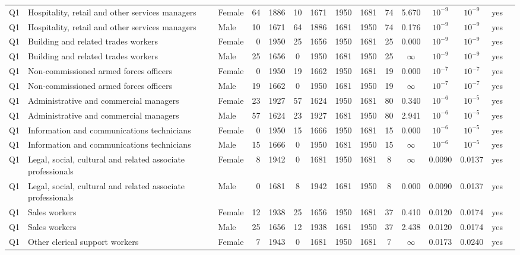 \begin{longtable}{lllrcccccccccll}
Q1 & Hospitality, retail and other services managers & Female & 64 & 1886 & 10 & 1671 & 1950 & 1681 & 74 & 5.670 & $10^{-9}$ & $10^{-9}$ & yes \\
Q1 & Hospitality, retail and other services managers & Male & 10 & 1671 & 64 & 1886 & 1681 & 1950 & 74 & 0.176 & $10^{-9}$ & $10^{-9}$ & yes \\
Q1 & Building and related trades workers & Female & 0 & 1950 & 25 & 1656 & 1950 & 1681 & 25 & 0.000 & $10^{-9}$ & $10^{-9}$ & yes \\
Q1 & Building and related trades workers & Male & 25 & 1656 & 0 & 1950 & 1681 & 1950 & 25 & $\infty$ & $10^{-9}$ & $10^{-9}$ & yes \\
Q1 & Non-commissioned armed forces officers & Female & 0 & 1950 & 19 & 1662 & 1950 & 1681 & 19 & 0.000 & $10^{-7}$ & $10^{-7}$ & yes \\
Q1 & Non-commissioned armed forces officers & Male & 19 & 1662 & 0 & 1950 & 1681 & 1950 & 19 & $\infty$ & $10^{-7}$ & $10^{-7}$ & yes \\
Q1 & Administrative and commercial managers & Female & 23 & 1927 & 57 & 1624 & 1950 & 1681 & 80 & 0.340 & $10^{-6}$ & $10^{-5}$ & yes \\
Q1 & Administrative and commercial managers & Male & 57 & 1624 & 23 & 1927 & 1681 & 1950 & 80 & 2.941 & $10^{-6}$ & $10^{-5}$ & yes \\
Q1 & Information and communications technicians & Female & 0 & 1950 & 15 & 1666 & 1950 & 1681 & 15 & 0.000 & $10^{-6}$ & $10^{-5}$ & yes \\
Q1 & Information and communications technicians & Male & 15 & 1666 & 0 & 1950 & 1681 & 1950 & 15 & $\infty$ & $10^{-6}$ & $10^{-5}$ & yes \\
Q1 & Legal, social, cultural and related associate professionals & Female & 8 & 1942 & 0 & 1681 & 1950 & 1681 & 8 & $\infty$ & 0.0090 & 0.0137 & yes \\
Q1 & Legal, social, cultural and related associate professionals & Male & 0 & 1681 & 8 & 1942 & 1681 & 1950 & 8 & 0.000 & 0.0090 & 0.0137 & yes \\
Q1 & Sales workers & Female & 12 & 1938 & 25 & 1656 & 1950 & 1681 & 37 & 0.410 & 0.0120 & 0.0174 & yes \\
Q1 & Sales workers & Male & 25 & 1656 & 12 & 1938 & 1681 & 1950 & 37 & 2.438 & 0.0120 & 0.0174 & yes \\
Q1 & Other clerical support workers & Female & 7 & 1943 & 0 & 1681 & 1950 & 1681 & 7 & $\infty$ & 0.0173 & 0.0240 & yes \\

\end{longtable}
